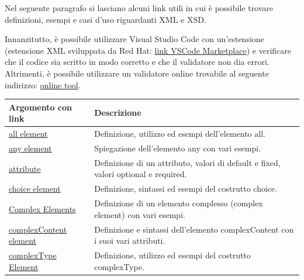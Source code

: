 \documentclass[a4paper]{article}
\begin{document}
	Nel seguente paragrafo si lasciano alcuni link utili in cui è possibile trovare definizioni, esempi e casi d'uso riguardanti XML e XSD.\newline
	
	\noindent
	Innanzitutto, è possibile utilizzare Visual Studio Code con un'estensione (estensione XML sviluppata da Red Hat: \href{https://marketplace.visualstudio.com/items?itemName=redhat.vscode-xml}{link VSCode Marketplace}) e verificare che il codice sia scritto in modo corretto e che il validatore non dia errori. Altrimenti, è possibile utilizzare un validatore online trovabile al seguente indirizzo: \href{https://www.utilities-online.info/xsdvalidation}{online tool}.
	\begin{table}[!htp]
		\centering
		\begin{tabular}{@{} l p{23em} @{}}
			\toprule
			Argomento con link & Descrizione \\
			\midrule
			\href{https://www.w3schools.com/xml/el_all.asp}{all element} & Definizione, utilizzo ed esempi dell'elemento \textsf{all}. \\ [0.5em]
			
			\href{https://www.w3schools.com/XML/schema_complex_any.asp}{any element} & Spiegazione dell'elemento \textsf{any} con vari esempi. \\ [0.5em]
			
			\href{https://www.w3schools.com/xml/schema_simple_attributes.asp}{attribute} & Definizione di un attributo, valori di \textsf{default} e \textsf{fixed}, valori \textsf{optional} e \textsf{required}. \\ [0.5em]
			
			\href{https://www.w3schools.com/xml/el_choice.asp}{choice element} & Definizione, sintassi ed esempi del costrutto \textsf{choice}. \\ [0.5em]
			
			\href{https://www.w3schools.com/xml/schema_complex.asp}{Complex Elements} & Definizione di un elemento complesso (\textsf{complex element}) con vari esempi. \\ [0.5em]
			
			\href{https://www.w3schools.com/xml/el_complexcontent.asp}{complexContent element} & Definizione e sintassi dell'elemento \textsf{complexContent} con i suoi vari attributi. \\ [0.5em]
			
			\href{https://www.w3schools.com/xml/el_complextype.asp}{complexType Element} & Definizione, utilizzo ed esempi del costrutto \textsf{complexType}. \\ [0.5em]
			

\end{tabular}
\end{table}
\end{document}
